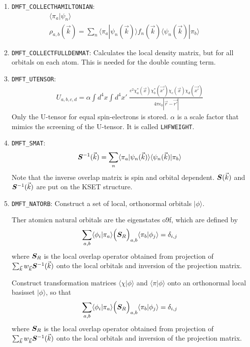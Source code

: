 \documentclass[11pt,a4paper]{report}
\begin{document}
\begin{enumerate}
\item \verb|DMFT_COLLECTHAMILTONIAN|:
\begin{eqnarray}
\langle\pi_a|\psi_n\rangle&&
\\
\rho_{a,b}(\vec{k})=\sum_n
\langle\pi_a|\psi_n(\vec{k})\rangle f_n(\vec{k})
\langle\psi_n(\vec{k})|\pi_b\rangle
\end{eqnarray}
%
\item \verb|DMFT_COLLECTFULLDENMAT|: Calculates the local density matrix,
  but for all orbitals on each atom. This is needed for the double
  counting term.
%
\item \verb|DMFT_UTENSOR|: 
\begin{eqnarray}
U_{a,b,c,d}=\alpha\int d^4x\int d^4x'\;
\frac{e^2\chi^*_a(\vec{x})\chi^*_b(\vec{x'})\chi_c(\vec{x})\chi_d(\vec{x'})}
{4\pi\epsilon_0|\vec{r}-\vec{r'}|}
\label{eq:defutensordmftobject}
\end{eqnarray}
Only the U-tensor for equal spin-electrons is stored. $\alpha$ is a
scale factor that mimics the screening of the U-tensor. It is called
\verb|LHFWEIGHT|.
%
\item \verb|DMFT_SMAT|:
\begin{eqnarray}
\bm{S}^{-1}(\vec{k})
=\sum_n\langle\pi_a|\psi_n(\vec{k})\rangle\langle\psi_n(\vec{k})|\pi_b\rangle
\end{eqnarray}
Note that the inverse overlap matrix is spin and orbital dependent.
$\bm{S}(\vec{k})$ and $\bm{S}^{-1}(\vec{k})$ are put on the KSET
structure.
%
\item \verb|DMFT_NATORB|: Construct a set of local, orthonormal orbitals
  $|\phi\rangle$. 


Ther atomicn natural orbitals are the eigenstates o9f, which are defined by
\begin{eqnarray}
\sum_{a,b}
\langle\phi_i|\pi_a\rangle\Bigl(\bm{S}_R\Bigr)_{a,b}
\langle\pi_b|\phi_j\rangle=\delta_{i,j}
\end{eqnarray}
where $\bm{S}_R$ is the local overlap operator obtained from
projection of $\sum_{\vec{k}} w_{\vec{k}}\bm{S}^{-1}(\vec{k})$ onto the
local orbitals and inversion of the projection matrix.


Construct transformation matrices
  $\langle\chi|\phi\rangle$ and $\langle\pi|\phi\rangle$ onto an
  orthonormal local basisset $|\phi\rangle$, so that 
\begin{eqnarray}
\sum_{a,b}
\langle\phi_i|\pi_a\rangle\Bigl(\bm{S}_R\Bigr)_{a,b}
\langle\pi_b|\phi_j\rangle=\delta_{i,j}
\end{eqnarray}
where $\bm{S}_R$ is the local overlap operator obtained from
projection of $\sum_{\vec{k}} w_{\vec{k}}\bm{S}^{-1}(\vec{k})$ onto the
local orbitals and inversion of the projection matrix.


\end{enumerate}
\end{document}
